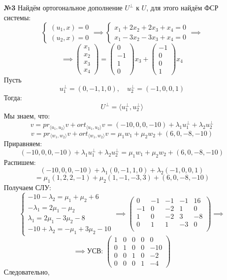 \documentclass[a4paper]{article}
\newcommand{\mat}[1]{\begin{pmatrix} #1 \end{pmatrix}}
\newcommand{\case}[1]{\begin{cases} #1 \end{cases}}
\begin{document}
\begin{enumerate}
    \item[\textbf{№3}]Найдём ортогональное дополнение $U^\perp$ к $U$, для этого найдём ФСР системы:
    $$\case{
        (u_1, x) = 0\\
        (u_2, x) = 0
    } \implies \case{
        x_1+2x_2 + 2x_3 + x_4 = 0\\
        x_1-3x_2-3x_3 + x_4 = 0
    }\implies$$
    $$ \implies \mat{x_1\\x_2\\x_3\\x_4} = \mat{0\\-1\\1\\0}x_3 + \mat{-1\\0\\0\\1}x_4$$
    Пусть
    $$u_1^\perp = (0, -1, 1, 0), \quad u_2^\perp = (-1, 0, 0, 1)$$
    Тогда:
    $$U^\perp = \langle u_1^\perp, u_2^\perp \rangle$$
    Мы знаем, что:
    $$v = pr_{\langle u_1, u_2 \rangle} v  + ort_{\langle u_1, u_2 \rangle} v = 
     (-10, 0, 0, -10)  + \lambda_1 u_1^\perp + \lambda_2 u_2^\perp $$
    $$v = pr_{\langle w_1, w_2 \rangle} v  + ort_{\langle w_1, w_2 \rangle} v = 
     \mu_1 w_1 + \mu_2 w_2 + (6, 0, -8, -10)$$
    Приравняем:
    $$(-10, 0, 0, -10)  + \lambda_1 u_1^\perp + \lambda_2 u_2^\perp  = \mu_1 w_1 + \mu_2 w_2 + (6, 0, -8, -10)$$
    Распишем:
    $$(-10, 0, 0, -10)  + \lambda_1 (0, -1, 1, 0) + \lambda_2 (-1, 0, 0, 1)  $$
    $$= \mu_1(1, 2, 2, -1) + \mu_2 (1, -1, -3, 3) + (6, 0, -8, -10)$$
    Получаем СЛУ:
    $$\begin{cases}
        -10 - \lambda_2 = \mu_1 + \mu_2 + 6 \\
        -\lambda_1 = 2\mu_1 - \mu_2 \\
        \lambda_1 = 2\mu_1 - 3\mu_2 - 8 \\
        -10 + \lambda_2 = -\mu_1 + 3\mu_2 - 10
        \end{cases} \implies \begin{pmatrix}
            0 & -1 & -1 & -1 & 16 \\
            -1 & 0 & -2 & 1 & 0 \\
            1 & 0 & -2 & 3 & -8 \\
            0 & 1 & 1 & -3 & 0 \\
            \end{pmatrix} \implies$$
    $$\implies\text{УСВ: } 
    \begin{pmatrix}
        1 & 0 & 0 & 0 & 0 \\
        0 & 1 & 0 & 0 & -10 \\
        0 & 0 & 1 & 0 & -2 \\
        0 & 0 & 0 & 1 & -4
        \end{pmatrix}
    $$
    Следовательно,
    

\end{enumerate}
\end{document}
